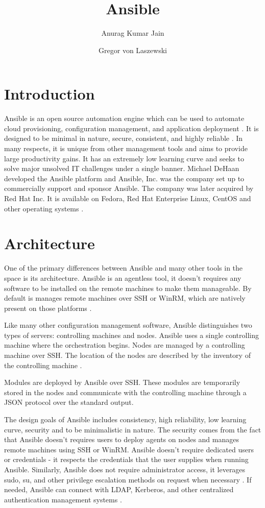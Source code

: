 \documentclass[9pt,twocolumn,twoside]{../../styles/osajnl}
\title{Ansible}
\author[1]{Anurag Kumar Jain}
\author[1,*]{Gregor von Laszewski}
\affil[1]{School of Informatics and Computing, Bloomington, IN 47408, U.S.A.}
\affil[*]{Corresponding authors: laszewski@gmail.com}
\begin{document}
\maketitle

\section{Introduction}

Ansible is an open source automation engine which can be used to
automate cloud provisioning, configuration management, and application
deployment \cite{www-ansible-wikipedia}. It is designed to be minimal
in nature, secure, consistent, and highly reliable
\cite{www-ansible3}. In many respects, it is unique from other
management tools and aims to provide large productivity gains. It has
an extremely low learning curve and seeks to solve major unsolved IT
challenges under a single banner.  Michael DeHaan developed the
Ansible platform and Ansible, Inc. was the company set up to
commercially support and sponsor Ansible. The company was later
acquired by Red Hat Inc. It is available on Fedora, Red Hat Enterprise
Linux, CentOS and other operating systems
\cite{www-ansible-wikipedia}.

\section{Architecture}

One of the primary differences between Ansible and many other tools in
the space is its architecture. Ansible is an agentless tool, it
doesn't requires any software to be installed on the remote machines
to make them manageable. By default is manages remote machines over
SSH or WinRM, which are natively present on those
platforms \cite{www-ansible}.

Like many other configuration management software, Ansible
distinguishes two types of servers: controlling machines and
nodes. Ansible uses a single controlling machine where the
orchestration begins. Nodes are managed by a controlling machine over
SSH. The location of the nodes are described by the inventory of the
controlling machine \cite{www-ansible3}.

Modules are deployed by Ansible over SSH. These modules are
temporarily stored in the nodes and communicate with the controlling
machine through a JSON protocol over the standard
output.\cite{www-ansible}

The design goals of Ansible includes consistency, high reliability,
low learning curve, security and to be minimalistic in nature. The
security comes from the fact that Ansible doesn't requires users to
deploy agents on nodes and manages remote machines using SSH or
WinRM. Ansible doesn't require dedicated users or credentials - it
respects the credentials that the user supplies when running
Ansible. Similarly, Ansible does not require administrator access, it
leverages sudo, su, and other privilege escalation methods on request
when necessary \cite{github-ansible}. If needed, Ansible can connect
with LDAP, Kerberos, and other centralized authentication management
systems \cite{www-ansible2}.
\end{document}
